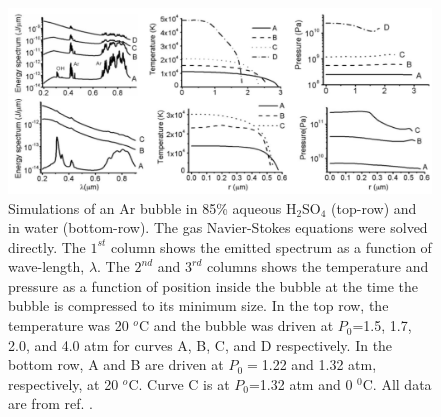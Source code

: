 \documentclass[11pt,prb,aps,nofootinbib,superscriptaddress,floatfix]{revtex4-2}
\begin{document}
\begin{figure}
\includegraphics[width=0.9\linewidth]{figs/light.pdf}
    \caption{Simulations of an Ar bubble in 85\% aqueous H$_2$SO$_4$ (top-row) and in water (bottom-row). The gas Navier-Stokes equations were solved directly. The $1^{st}$ column shows the emitted spectrum as a function of wave-length, $\lambda$. The $2^{nd}$ and $3^{rd}$ columns shows the temperature and pressure as a function of position inside the bubble at the time the bubble is compressed to its minimum size. In the top row, the temperature was 20 $^o$C and the bubble was driven at $P_0$=1.5, 1.7, 2.0, and 4.0 atm for curves A, B, C, and D respectively. In the bottom row, A and B are driven at $P_0=$1.22 and 1.32 atm, respectively, at 20 $^o$C. Curve C is at $P_0$=1.32 atm and 0 $^0$C. All data are from ref. \cite{an2009diagnosing}.}
\label{fig:light}
\end{figure}
\end{document}
